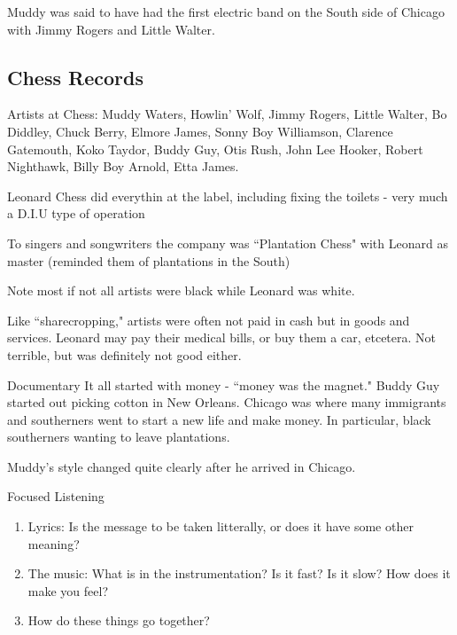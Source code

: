 \documentclass[12pt, a4paper, twoside, openright, titlepage]{book}
\begin{document}
\begin{rmk}{}{}
    Muddy was said to have had the first electric band on the South side of Chicago with Jimmy Rogers and Little Walter.
\end{rmk}

\subsection{Chess Records}

\begin{rmk}{}{}
    Artists at Chess: Muddy Waters, Howlin' Wolf, Jimmy Rogers, Little Walter, Bo Diddley, Chuck Berry, Elmore James, Sonny Boy Williamson, Clarence Gatemouth, Koko Taydor, Buddy Guy, Otis Rush, John Lee Hooker, Robert Nighthawk, Billy Boy Arnold, Etta James.
\end{rmk}


Leonard Chess did everythin at the label, including fixing the toilets - very much a D.I.U type of operation

\begin{rmk}{}{}
    To singers and songwriters the company was ``Plantation Chess" with Leonard as master (reminded them of plantations in the South)

    Note most if not all artists were black while Leonard was white.
\end{rmk}

Like ``sharecropping," artists were often not paid in cash but in goods and services. Leonard may pay their medical bills, or buy them a car, etcetera. Not terrible, but was definitely not good either.

\begin{rmk}{Documentary}{}
    It all started with money - ``money was the magnet." Buddy Guy started out picking cotton in New Orleans. Chicago was where many immigrants and southerners went to start a new life and make money. In particular, black southerners wanting to leave plantations.
\end{rmk}

Muddy's style changed quite clearly after he arrived in Chicago.

\begin{defn}{Focused Listening}{}
    \leavevmode
    \begin{enumerate}
        \item Lyrics: Is the message to be taken litterally, or does it have some other meaning?
        \item The music: What is in the instrumentation? Is it fast? Is it slow? How does it make you feel?
        \item How do these things go together?
    \end{enumerate}
\end{defn}
\end{document}
